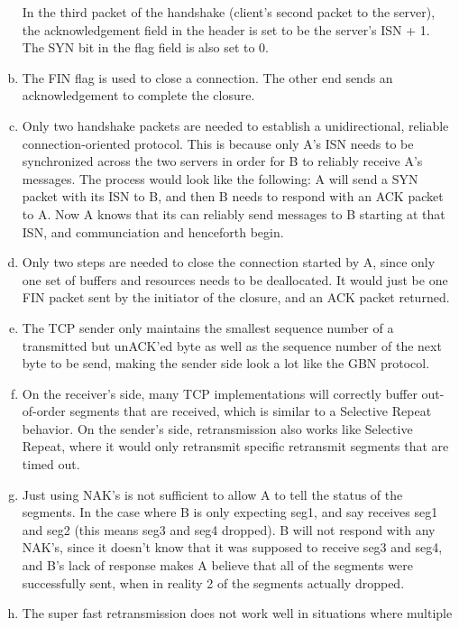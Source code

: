\documentclass[11pt]{article}
\begin{document}
\begin{enumerate}[(a)]
      In the third packet of the handshake (client's second packet to the server),
      the acknowledgement field in the header is set to be the server's ISN + 1.
      The SYN bit in the flag field is also set to 0.
    \item
      The FIN flag is used to close a connection. The other end sends an acknowledgement
      to complete the closure.
    \item
      Only two handshake packets are needed to establish a unidirectional, reliable
      connection-oriented protocol. This is because only A's ISN needs to be
      synchronized across the two servers in order for B to reliably receive
      A's messages. The process would look like the following: A will send a SYN packet
      with its ISN to B, and then B needs to respond with an ACK packet to A. Now
      A knows that its can reliably send messages to B starting at that ISN,
      and communciation and henceforth begin.
    \item
      Only two steps are needed to close the connection started by A, since only
      one set of buffers and resources needs to be deallocated. It would just be
      one FIN packet sent by the initiator of the closure, and an ACK packet
      returned.
    \item
      The TCP sender only maintains the smallest sequence number of a transmitted
      but unACK'ed byte as well as the sequence number of the next byte to be send,
      making the sender side look a lot like the GBN protocol.
    \item
      On the receiver's side, many TCP implementations will correctly buffer
      out-of-order segments that are received, which is similar to a Selective
      Repeat behavior. On the sender's side, retransmission also works like
      Selective Repeat, where it would only retransmit specific retransmit segments that
      are timed out.
    \item
      Just using NAK's is not sufficient to allow A to tell the status of the segments.
      In the case where B is only expecting seg1, and say receives seg1 and seg2
      (this means seg3 and seg4 dropped). B will not respond with any NAK's,
      since it doesn't know that it was supposed to receive seg3 and seg4, and B's
      lack of response makes A believe that all of the segments were successfully sent,
      when in reality 2 of the segments actually dropped.
    \item
      The super fast retransmission does not work well in situations where multiple

\end{enumerate}
\end{document}
